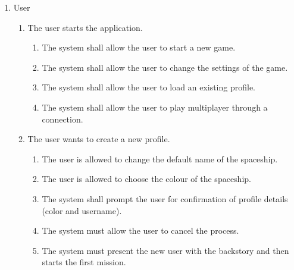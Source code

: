 \documentclass[]{article}
\begin{document}



\begin{enumerate}[{VP}1.]
	\item User 
	\begin{enumerate}[{BE1}.1]
	
	    \item The user starts the application.
	    \begin{enumerate}
	        \item The system shall allow the user to start a new game. 
	        \item The system shall allow the user to change the settings of the game.
	        \item The system shall allow the user to load an existing profile.
	        \item The system shall allow the user to play multiplayer through a connection.
	    \end{enumerate}
	    
		 
		\item The user wants to create a new profile.
		\begin{enumerate}
			\item The user is allowed to change the default name of the spaceship.
			\item The user is allowed to choose the colour of the spaceship.
			\item The system shall prompt the user for confirmation of profile details (color and username).
			\item The system must allow the user to cancel the process.
			\item The system must present the new user with the backstory and then starts the first mission.
		\end{enumerate}
	

\end{enumerate}
\end{enumerate}
\end{document}
